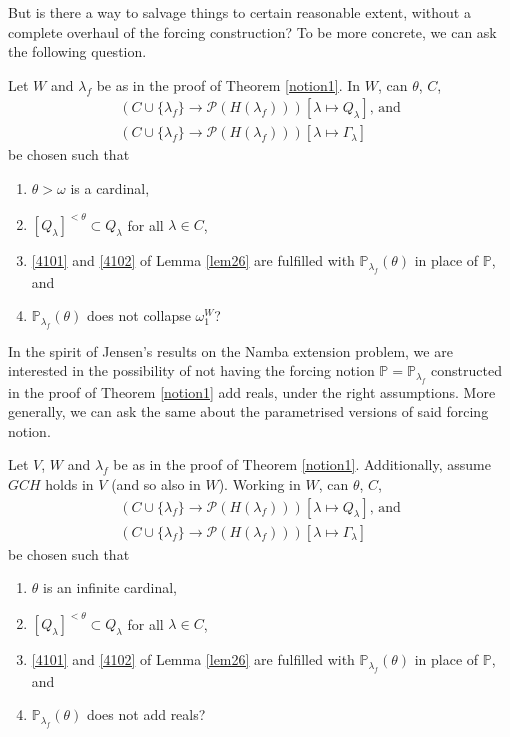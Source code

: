 \documentclass[12pt]{article}
\numberwithin{equation}{section}
\begin{document}
But is there a way to salvage things to certain reasonable extent, without a complete overhaul of the forcing construction? To be more concrete, we can ask the following question.

\begin{ques}\label{oq1}
Let $W$ and $\lambda_f$ be as in the proof of Theorem \ref{notion1}. In $W$, can $\theta$, $C$, 
\begin{gather*}
    (C \cup \{\lambda_f\} \longrightarrow \mathcal{P}(H(\lambda_f))) [\lambda \mapsto Q_{\lambda}] \text{, and} \\
    (C \cup \{\lambda_f\} \longrightarrow \mathcal{P}(H(\lambda_f))) [\lambda \mapsto \Gamma_{\lambda}]
\end{gather*}
be chosen such that 
\begin{enumerate}[label=(\arabic*)]
    \item $\theta > \omega$ is a cardinal,
    \item $[Q_{\lambda}]^{< \theta} \subset Q_{\lambda}$ for all $\lambda \in C$,
    \item \ref{4101} and \ref{4102} of Lemma \ref{lem26} are fulfilled with $\mathbb{P}_{\lambda_f}(\theta)$ in place of $\mathbb{P}$, and
    \item $\mathbb{P}_{\lambda_f}(\theta)$ does not collapse $\omega_1^W$?
\end{enumerate}
\end{ques}

In the spirit of Jensen's results on the Namba extension problem, we are interested in the possibility of not having the forcing notion $\mathbb{P} = \mathbb{P}_{\lambda_f}$ constructed in the proof of Theorem \ref{notion1} add reals, under the right assumptions. More generally, we can ask the same about the parametrised versions of said forcing notion. 

\begin{ques}\label{addsreals}
Let $V$, $W$ and $\lambda_f$ be as in the proof of Theorem \ref{notion1}. Additionally, assume $GCH$ holds in $V$ (and so also in $W$). Working in $W$, can $\theta$, $C$, 
\begin{gather*}
    (C \cup \{\lambda_f\} \longrightarrow \mathcal{P}(H(\lambda_f))) [\lambda \mapsto Q_{\lambda}] \text{, and} \\
    (C \cup \{\lambda_f\} \longrightarrow \mathcal{P}(H(\lambda_f))) [\lambda \mapsto \Gamma_{\lambda}]
\end{gather*}
be chosen such that
\begin{enumerate}[label=(\arabic*)]
    \item $\theta$ is an infinite cardinal,
    \item $[Q_{\lambda}]^{< \theta} \subset Q_{\lambda}$ for all $\lambda \in C$,
    \item  \ref{4101} and \ref{4102} of Lemma \ref{lem26} are fulfilled with $\mathbb{P}_{\lambda_f}(\theta)$ in place of $\mathbb{P}$, and
    \item $\mathbb{P}_{\lambda_f}(\theta)$ does not add reals?
\end{enumerate}
\end{ques}
\end{document}
